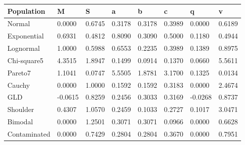 \begin{tabular}{llllllll}
\toprule
Population & M & S & a & b & c & q & v \\
\midrule
Normal & 0.0000 & 0.6745 & 0.3178 & 0.3178 & 0.3989 & 0.0000 & 0.6189 \\
Exponential & 0.6931 & 0.4812 & 0.8090 & 0.3090 & 0.5000 & 0.1180 & 0.4944 \\
Lognormal & 1.0000 & 0.5988 & 0.6553 & 0.2235 & 0.3989 & 0.1389 & 0.8975 \\
Chi-square5 & 4.3515 & 1.8947 & 0.1499 & 0.0914 & 0.1370 & 0.0660 & 5.5611 \\
Pareto7 & 1.1041 & 0.0747 & 5.5505 & 1.8781 & 3.1700 & 0.1325 & 0.0134 \\
Cauchy & 0.0000 & 1.0000 & 0.1592 & 0.1592 & 0.3183 & 0.0000 & 2.4674 \\
GLD & -0.0615 & 0.8259 & 0.2456 & 0.3033 & 0.3169 & -0.0268 & 0.8737 \\
Shoulder & 0.4307 & 1.0570 & 0.2459 & 0.1033 & 0.2727 & 0.1017 & 3.0471 \\
Bimodal & 0.0000 & 1.2501 & 0.3071 & 0.3071 & 0.0966 & 0.0000 & 0.6628 \\
Contaminated & 0.0000 & 0.7429 & 0.2804 & 0.2804 & 0.3670 & 0.0000 & 0.7951 \\
\bottomrule
\end{tabular}
